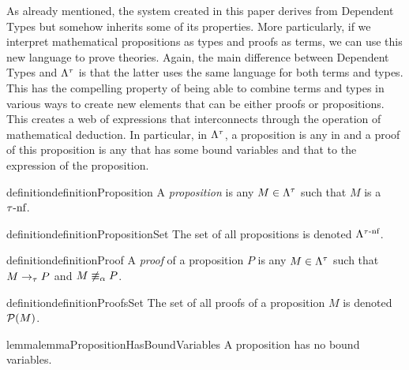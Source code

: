 As already mentioned, the system created in this paper derives from Dependent Types but somehow inherits some of its properties. More particularly, if we interpret mathematical propositions as types and proofs as terms, we can use this new language to prove theories. Again, the main difference between Dependent Types and $\Lambda^{\tau}$ is that the latter uses the same language for both terms and types. This has the compelling property of being able to combine terms and types in various ways to create new elements that can be either proofs or propositions. This creates a web of expressions that interconnects through the operation of mathematical deduction. In particular, in $\Lambda^{\tau}$, a proposition is any \lambdatauterm in \taunormalform and a proof of this proposition is any \lambdatauterm that has some bound variables and that \taureduces to the expression of the proposition.

\begin{reusable}{definition}{definitionProposition}
    A  \textit{proposition} is any $M \in \Lambda^{\tau}$ such that $M$ is a $\tau\text{-}\text{nf}$.
\end{reusable}

\begin{reusable}{definition}{definitionPropositionSet}
    The set of all propositions is denoted $\Lambda^{\tau\text{-}\text{nf}}$.
\end{reusable}

\begin{reusable}{definition}{definitionProof}
    A  \textit{proof} of a proposition $P$ is any $M \in \Lambda^{\tau}$ such that $M \to_\tau P$ and $M \not\equiv_\alpha P$.
\end{reusable}

\begin{reusable}{definition}{definitionProofsSet}
    The set of all proofs of a proposition $M$ is denoted $\mathcal{P}(M)$.
\end{reusable}

\begin{reusable}{lemma}{lemmaPropositionHasBoundVariables}
    A proposition has no bound variables.
\end{reusable}